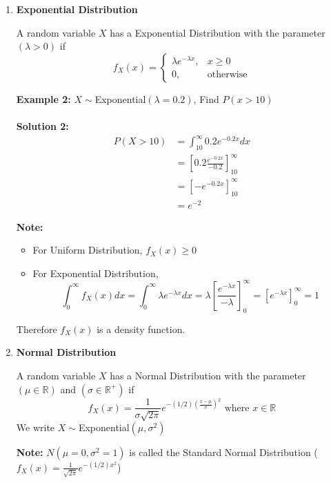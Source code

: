 \documentclass[12pt, twoside]{article}
\begin{document}
\begin{enumerate}
	\item{
	
	\textbf{Exponential Distribution}
	
	\begin{tcolorbox}[title=Defintion: Exponential Distribution]
		A random variable $X$ has a Exponential Distribution with the parameter $(\lambda > 0)$ if 
		$$f_X (x) = \begin{cases}
		\lambda e^{-\lambda x} , & x \geq 0\\
		0 , & \text{otherwise}
		\end{cases}$$
	\end{tcolorbox}
	
	\textbf{Example 2:} $X \sim $Exponential$(\lambda = 0.2)$, Find $P(x > 10)$\\
	\\
	\textbf{Solution 2:}
	\begin{align*}
		P(X > 10) &= \int^{\infty}_{10} 0.2e^{-0.2x} dx\\
		&= [0.2 \frac{e^{-0.2x}}{-0.2}]^{\infty}_{10}\\
		&= [ -e^{-0.2x}]^{\infty}_{10}\\
		&= e^{-2}
	\end{align*}
	
	\textbf{Note:}
	\begin{itemize}
		\item{For Uniform Distribution, $f_X (x) \geq 0$}
		\item{For Exponential Distribution, $$\int^{\infty}_{0} f_X (x) dx = \int^{\infty}_{0} \lambda e^{-\lambda x} dx = \lambda [\frac{e^{-\lambda x}}{-\lambda}]^{\infty}_{0} = [e^{-\lambda x}]^{\infty}_{0} = 1$$}
	\end{itemize}

	Therefore $f_X (x)$ is a density function.
	
	}
	\item{
	\textbf{Normal Distribution}
	
	\begin{tcolorbox}[title=Defintion: Normal Distribution]
		A random variable $X$ has a Normal Distribution with the parameter $(\mu \in\mathbb{R})$ and $(\sigma \in\mathbb{R}^{+})$ if 
		$$f_X (x) = \frac{1}{\sigma \sqrt{2\pi}} e^{-(1/2)(\frac{x - \mu}{\sigma})^2} \text{ where } x\in\mathbb{R}$$
		We write $X \sim $Exponential$(\mu, \sigma^2 )$
	\end{tcolorbox}
	
	\textbf{Note:} $N(\mu = 0, \sigma^2 = 1)$ is called the Standard Normal Distribution ($f_X (x) = \frac{1}{\sqrt{2\pi}} e^{-(1/2)x^2}$)
	
}
\end{enumerate}
\end{document}
